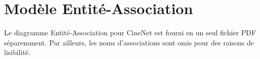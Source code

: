 \section*{Modèle Entité-Association}

Le diagramme Entité-Association pour CineNet est fourni en un seul fichier PDF séparemment. Par ailleurs, 
les noms d'associations sont omis pour des raisons de lisibilité.